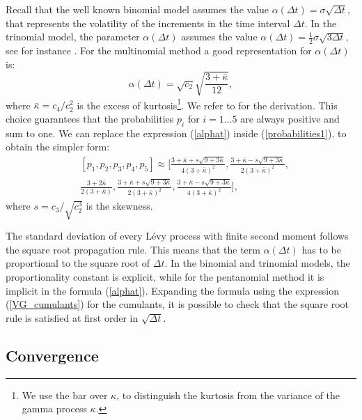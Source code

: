 Recall that the well known binomial model \cite{CRR79} assumes the value $\alpha(\Delta t) = \sigma \sqrt{\Delta t}$,
that represents the volatility of the increments in the time interval $\Delta t$.
In the trinomial model, the parameter $\alpha(\Delta t)$ assumes the value $\alpha(\Delta t) = \frac{1}{2} \sigma \sqrt{3\Delta t}$, see for instance \cite{YaPr01}.
For the multinomial method a good representation for $\alpha(\Delta t)$ is:
\begin{equation}\label{alphat}
 \alpha(\Delta t) = \sqrt{c_2} \sqrt{\frac{3+\bar \kappa}{12}},
\end{equation}
where $\bar \kappa = c_4 / c_2^2$ is the excess of kurtosis\footnote{We use the bar over $\kappa$, 
to distinguish the kurtosis from the variance of the gamma process $\kappa$.}. 
We refer to \cite{YaPr06} for the derivation.
This choice guarantees that the probabilities $p_i$ for $i=1...5$ are always positive and sum to one. We can replace the expression
(\ref{alphat}) inside (\ref{probabilities1}), to obtain the simpler form:
\begin{align}\label{probabilities2}
 & [p_1,p_2,p_3,p_4,p_5] \approx \biggl[ \frac{3+\bar \kappa+s\sqrt{9+3\bar \kappa}}{4(3+\bar \kappa)^2} , 
 \frac{3+\bar \kappa-s\sqrt{9+3\bar \kappa}}{2(3+\bar \kappa)^2} , \\ \nonumber
 &
 \frac{3+2\bar \kappa}{2(3+\bar \kappa)} ,
 \frac{3+\bar \kappa+s\sqrt{9+3\bar \kappa}}{2(3+\bar \kappa)^2} ,
 \frac{3+\bar \kappa-s\sqrt{9+3\bar \kappa}}{4(3+\bar \kappa)^2} \biggr],
\end{align}
where $s = c_3 / \sqrt{c_2^3}$ is the skewness.
\begin{Remark}
 The standard deviation of every L\'{e}vy process with finite second moment follows the square root propagation rule. This means that the term $\alpha(\Delta t)$ has to be proportional
 to the square root of $\Delta t$. In the binomial and trinomial models, the proportionality constant is explicit, while for the pentanomial method it is implicit
 in the formula (\ref{alphat}). Expanding the formula using the expression (\ref{VG_cumulants}) for the cumulants, it is possible to check that the square root rule is
 satisfied at first order in $\sqrt{\Delta t}$.
\end{Remark}



\subsection{Convergence}


